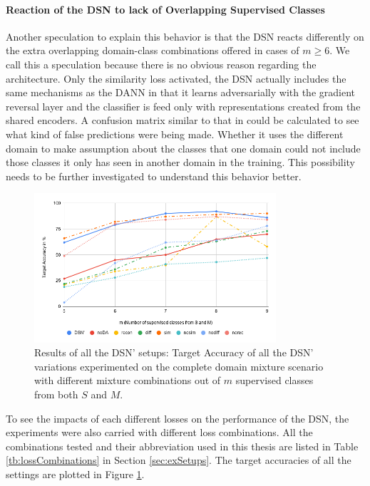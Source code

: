 \paragraph*{Reaction of the DSN to lack of Overlapping Supervised Classes} Another speculation to explain this behavior is that the DSN reacts differently on the extra overlapping domain-class combinations offered in cases of $m \geqslant 6$. We call this a speculation because there is no obvious reason regarding the architecture. Only the similarity loss activated, the DSN actually includes the same mechanisms as the DANN in that it learns adversarially with the gradient reversal layer and the classifier is feed only with representations created from the shared encoders. A confusion matrix similar to that in \cite{domainMixture} could be calculated to see what kind of false predictions were being made. Whether it uses the different domain to make assumption about the classes that one domain could not include those classes it only has seen in another domain in the training. This possibility needs to be further investigated to understand this behavior better. \\

\begin{figure}[tbh]
  \centering
    \includegraphics[width=0.8\textwidth]{abbildungen/allDSNResults.png}
    \caption{Results of all the DSN' setups: Target Accuracy of all the DSN' variations experimented on the complete domain mixture scenario with different mixture combinations out of $m$ supervised classes from both $S$ and $M$.}
  \label{fig:allDSNResults}
\end{figure}

To see the impacts of each different losses on the performance of the DSN, the experiments were also carried with different loss combinations. All the combinations tested and their abbreviation used in this thesis are listed in Table \ref{tb:lossCombinations} in Section \ref{sec:exSetups}. The target accuracies of all the settings are plotted in Figure \ref{fig:allDSNResults}.

